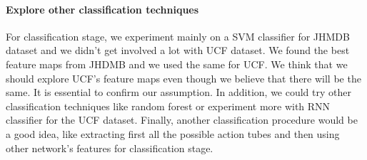 \paragraph{Explore other  classification techniques}
For classification stage, we experiment mainly on a SVM classifier for JHMDB dataset and we didn't get involved a lot with UCF dataset. We found the best feature maps from
JHDMB and we used the same for UCF. We think that we should explore UCF's feature maps even though we believe that there will be the same. It is essential to confirm our
assumption. In addition, we could try other classification techniques like random forest or experiment more with RNN classifier for the UCF dataset.
Finally, another classification procedure would be a good idea, like extracting first all the possible action tubes and then using other network's features for classification
stage.

% 
